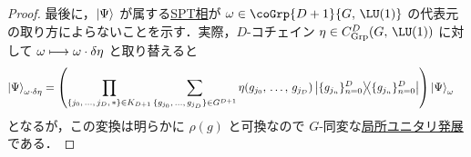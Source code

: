 \documentclass[TQFT_main]{subfiles}
\begin{document}
\begin{proof}
    最後に，$\ket{\Psi}$ が属する\hyperref[def:SPT-traditional]{SPT相}が $\omega \in \coGrp{D+1}{G,\, \LU(1)}$ の代表元の取り方によらないことを示す．実際，$D$-コチェイン $\eta \in C^D_{\mathrm{Grp}}(G,\, \LU(1))$ に対して
    $\omega \longmapsto \omega \cdot \delta \eta$ と取り替えると
    \begin{align}
        \ket{\Psi}_{\omega \cdot \delta \eta}
        &= \left(\prod_{\{j_0,\, \dots,\, j_{D},\, *\} \in K_{D+1}} \sum_{\{g_{j_0},\, \dots,\, g_{j_D}\} \in G^{D+1}} \eta (g_{j_0},\, \dots,\, g_{j_D}) \ketbra{\{g_{j_n}\}_{n=0}^D}{\{g_{j_n}\}_{n=0}^D} \right) \ket{\Psi}_\omega
    \end{align}
    となるが，この変換は明らかに $\rho(g)$ と可換なので $G$-同変な\hyperref[prop:LU]{局所ユニタリ発展}である．
\end{proof}
\end{document}

